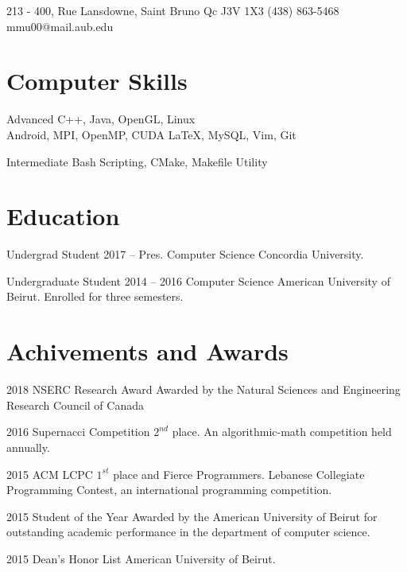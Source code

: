 \documentclass{tccv}
\begin{document}
\personal
    {213 - 400,  Rue Lansdowne, Saint Bruno \hspace{1cm} Qc J3V 1X3}
    {(438) 863-5468}
    {mmu00@mail.aub.edu}
    
\section{Computer Skills}

\begin{factlist}

\item{Advanced}
     {C++, Java, OpenGL, Linux\\Android, MPI, OpenMP, CUDA \LaTeX, MySQL, Vim, Git}


\item{Intermediate}
     {Bash Scripting, CMake, Makefile Utility}

\end{factlist}    
    

\section{Education}

\begin{yearlist}

\item[Undergrad Student]{2017 -- Pres.}
     {Computer Science } 
     {Concordia University.}

\item[Undergraduate Student]{2014 -- 2016}
     {Computer Science} 
     {American University of Beirut. Enrolled for three semesters.}



\end{yearlist}



\section{Achivements and Awards}

\begin{yearlist}

\item{2018}
     {NSERC Research Award}
     {Awarded by the Natural Sciences and Engineering Research Council of Canada}


\item{2016}
     {Supernacci Competition}
     {$2^{nd}$ place. An algorithmic-math competition held annually.}

\item{2015}
     {ACM LCPC}
     {$1^{st}$ place and Fierce Programmers. Lebanese Collegiate Programming Contest, an international programming competition.}

\item{2015}
     {Student of the Year}
     {Awarded by the American University of Beirut for outstanding academic performance in the department of computer science.}

\item{2015}
     {Dean's Honor List}
     {American University of Beirut.}

\end{yearlist}
\end{document}

